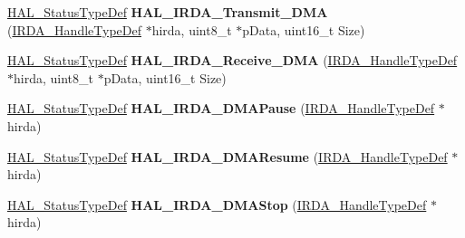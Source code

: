 \begin{DoxyCompactItemize}
\item 
\mbox{\label{group___i_r_d_a___exported___functions___group2_ga18d0f0c044c27c41223b2f0361fe3ae3}} 
\hyperlink{stm32f0xx__hal__def_8h_a63c0679d1cb8b8c684fbb0632743478f}{H\+A\+L\+\_\+\+Status\+Type\+Def} {\bfseries H\+A\+L\+\_\+\+I\+R\+D\+A\+\_\+\+Transmit\+\_\+\+D\+MA} (\hyperlink{struct_i_r_d_a___handle_type_def}{I\+R\+D\+A\+\_\+\+Handle\+Type\+Def} $\ast$hirda, uint8\+\_\+t $\ast$p\+Data, uint16\+\_\+t Size)
\item 
\mbox{\label{group___i_r_d_a___exported___functions___group2_gac62331245b03bde69283075bcfd8533c}} 
\hyperlink{stm32f0xx__hal__def_8h_a63c0679d1cb8b8c684fbb0632743478f}{H\+A\+L\+\_\+\+Status\+Type\+Def} {\bfseries H\+A\+L\+\_\+\+I\+R\+D\+A\+\_\+\+Receive\+\_\+\+D\+MA} (\hyperlink{struct_i_r_d_a___handle_type_def}{I\+R\+D\+A\+\_\+\+Handle\+Type\+Def} $\ast$hirda, uint8\+\_\+t $\ast$p\+Data, uint16\+\_\+t Size)
\item 
\mbox{\label{group___i_r_d_a___exported___functions___group2_ga4920b45618df428b579260ccb0783eb7}} 
\hyperlink{stm32f0xx__hal__def_8h_a63c0679d1cb8b8c684fbb0632743478f}{H\+A\+L\+\_\+\+Status\+Type\+Def} {\bfseries H\+A\+L\+\_\+\+I\+R\+D\+A\+\_\+\+D\+M\+A\+Pause} (\hyperlink{struct_i_r_d_a___handle_type_def}{I\+R\+D\+A\+\_\+\+Handle\+Type\+Def} $\ast$hirda)
\item 
\mbox{\label{group___i_r_d_a___exported___functions___group2_gaf82acca0902e184d0805569889932795}} 
\hyperlink{stm32f0xx__hal__def_8h_a63c0679d1cb8b8c684fbb0632743478f}{H\+A\+L\+\_\+\+Status\+Type\+Def} {\bfseries H\+A\+L\+\_\+\+I\+R\+D\+A\+\_\+\+D\+M\+A\+Resume} (\hyperlink{struct_i_r_d_a___handle_type_def}{I\+R\+D\+A\+\_\+\+Handle\+Type\+Def} $\ast$hirda)
\item 
\mbox{\label{group___i_r_d_a___exported___functions___group2_ga3ffa3a8e6af6c73b96c482b306d20c6b}} 
\hyperlink{stm32f0xx__hal__def_8h_a63c0679d1cb8b8c684fbb0632743478f}{H\+A\+L\+\_\+\+Status\+Type\+Def} {\bfseries H\+A\+L\+\_\+\+I\+R\+D\+A\+\_\+\+D\+M\+A\+Stop} (\hyperlink{struct_i_r_d_a___handle_type_def}{I\+R\+D\+A\+\_\+\+Handle\+Type\+Def} $\ast$hirda)

\end{DoxyCompactItemize}
